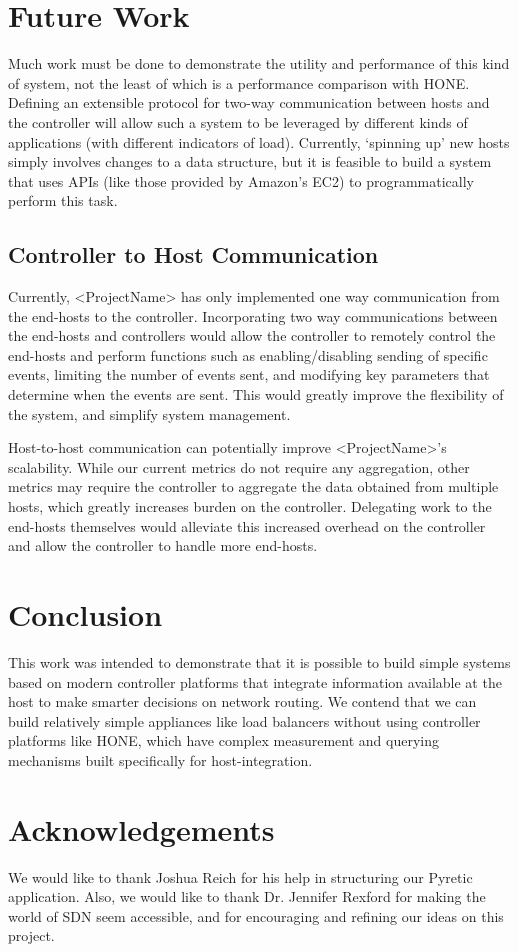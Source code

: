 \documentclass[10pt]{article}
\begin{document}
\section{Future Work}

Much work must be done to demonstrate the utility and performance of this kind of system, not the least of which is a performance comparison with HONE\cite{HONE}. Defining an extensible protocol for two-way communication between hosts and the controller will allow such a system to be leveraged by different kinds of applications (with different indicators of load). Currently, ‘spinning up’ new hosts simply involves changes to a data structure, but it is feasible to build a system that uses APIs (like those provided by Amazon’s EC2) to programmatically perform this task.

\subsection{Controller to Host Communication}

Currently, <ProjectName> has only implemented one way communication from the end-hosts to the controller. Incorporating two way communications between the end-hosts and controllers would allow the controller to remotely control the end-hosts and perform functions such as enabling/disabling sending of specific events, limiting the number of events sent, and modifying key parameters that determine when the events are sent. This would greatly improve the flexibility of the system, and simplify system management. 

Host-to-host communication can potentially improve <ProjectName>’s scalability. While our current metrics do not require any aggregation, other metrics may require the controller to aggregate the data obtained from multiple hosts, which greatly increases burden on the controller. Delegating work to the end-hosts themselves would alleviate this increased overhead on the controller and allow the controller to handle more end-hosts.

\section{Conclusion}

This work was intended to demonstrate that it is possible to build simple systems based on modern controller platforms that integrate information available at the host to make smarter decisions on network routing. We contend that we can build relatively simple appliances like load balancers without using controller platforms like HONE, which have complex measurement and querying mechanisms built specifically for host-integration.

\section{Acknowledgements}

We would like to thank Joshua Reich for his help in structuring our Pyretic application. Also, we would like to thank Dr. Jennifer Rexford for making the world of SDN seem accessible, and for encouraging and refining our ideas on this project.

{}

\end{document}
